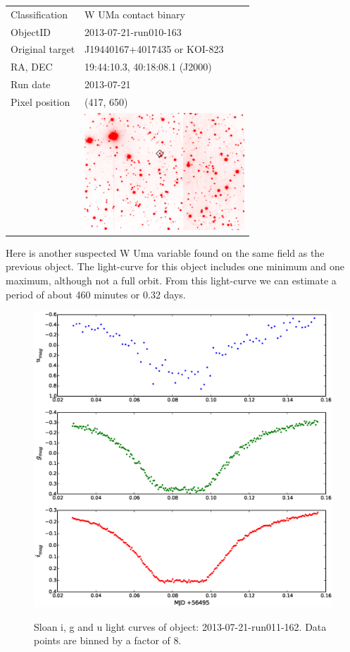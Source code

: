 \begin{tabular}{l l}
  Classification & {W UMa} contact binary \\
  ObjectID & 2013-07-21-run010-163 \\
  Original target & J19440167+4017435 or KOI-823 \\
  RA, DEC & 19:44:10.3, 40:18:08.1 (J2000) \\
  Run date & 2013-07-21 \\
  Pixel position & (417, 650) \\
       & \includegraphics[width=60mm]{images/2013-07-21-run010-163.png} \\
  \end{tabular}

Here is another suspected {W Uma} variable found on the same field as the previous object. The light-curve for this object includes one minimum and one maximum, although not a full orbit. From this light-curve we can estimate a period of about 460 minutes or 0.32 days.

\newpage
  
\begin{figure}
  \center
  \includegraphics[width=120mm]{images/2013-07-21-run011-162_lightcurve-bin8.eps}
  \label{fig:2013-07-21-run011-162}
  \caption{Sloan i, g and u light curves of object: 2013-07-21-run011-162. Data points are binned by a factor of 8.}
\end{figure}


